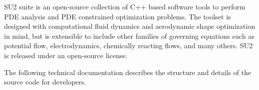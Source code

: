 S\+U2 suite is an open-\/source collection of C++ based software tools to perform P\+DE analysis and P\+DE constrained optimization problems. The toolset is designed with computational fluid dynamics and aerodynamic shape optimization in mind, but is extensible to include other families of governing equations such as potential flow, electrodynamics, chemically reacting flows, and many others. S\+U2 is released under an open-\/source license.

The following technical documentation describes the structure and details of the source code for developers. 